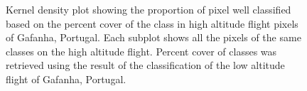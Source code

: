 \documentclass[
  number]{elsarticle}
\begin{document}
\label{cell-fig-upscaling}
\begin{figure}[H]


\caption{\label{fig-upscaling}Kernel density plot showing the proportion
of pixel well classified based on the percent cover of the class in high
altitude flight pixels of Gafanha, Portugal. Each subplot shows all the
pixels of the same classes on the high altitude flight. Percent cover of
classes was retrieved using the result of the classification of the low
altitude flight of Gafanha, Portugal.}

\end{figure}%
\end{document}
